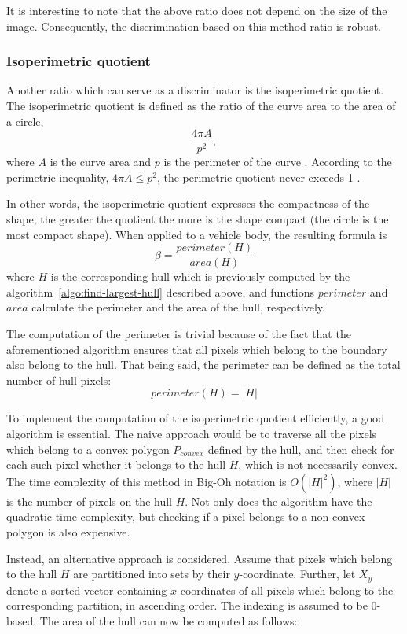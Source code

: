 \documentclass[times, utf8, zavrsni]{fer}
\begin{document}
It is interesting to note that the above ratio does not depend on the size of
the image. Consequently, the discrimination based on this method ratio is
robust.

\subsubsection{Isoperimetric quotient}

Another ratio which can serve as a discriminator is the isoperimetric quotient.
The isoperimetric quotient is defined as the ratio of the curve area to the area
of a circle, \[\frac{4 \pi A}{p^2},\] where $A$ is the curve area and $p$ is the
perimeter of the curve \citep{isoperimetric-quotient:mathworld}. According to
the perimetric inequality, $4 \pi A \leq p^2$, the perimetric quotient never
exceeds 1 \citep{isoperimetric-inequality:springer}.

In other words, the isoperimetric quotient expresses the compactness of the
shape; the greater the quotient the more is the shape compact (the circle is the most
compact shape). When applied to a vehicle body, the resulting formula is \[
\beta = \frac{perimeter(H)}{area(H)} \] where $H$ is the corresponding hull
which is previously computed by the algorithm~\ref{algo:find-largest-hull}
described above, and functions $perimeter$ and $area$ calculate the perimeter
and the area of the hull, respectively.

The computation of the perimeter is trivial because of the fact that the
aforementioned algorithm ensures that all pixels which belong to the boundary
also belong to the hull. That being said, the perimeter can be defined as the
total number of hull pixels: \[perimeter(H) = |H|\]

To implement the computation of the isoperimetric quotient efficiently, a good
algorithm is essential. The naive approach would be to traverse all the pixels
which belong to a convex polygon $P_{convex}$ defined by the hull, and then
check for each such pixel whether it belongs to the hull $H$, which is not
necessarily convex. The time complexity of this method in Big-Oh notation is
$O(|H|^2)$, where $|H|$ is the number of pixels on the hull $H$. Not only does
the algorithm have the quadratic time complexity, but checking if a pixel
belongs to a non-convex polygon is also expensive.

Instead, an alternative approach is considered. Assume that pixels which belong
to the hull $H$ are partitioned into sets by their $y$-coordinate. Further, let
$X_y$ denote a sorted vector containing $x$-coordinates of all pixels which
belong to the corresponding partition, in ascending order. The indexing is
assumed to be 0-based. The area of the hull can now be computed as follows:
\end{document}
